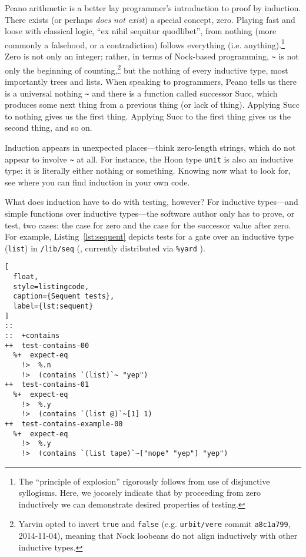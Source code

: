 \documentclass[twoside]{article}
\begin{document}
Peano arithmetic is a better lay programmer's introduction to proof by induction. There exists (or perhaps \emph{does not exist}) a special concept, zero. Playing fast and loose with classical logic, “ex nihil sequitur quodlibet”, from nothing (more commonly a falsehood, or a contradiction) follows everything (i.e. anything).\footnote{The “principle of explosion” rigorously follows from use of disjunctive syllogisms.  Here, we jocosely indicate that by proceeding from zero inductively we can demonstrate desired properties of testing.} Zero is not only an integer; rather, in terms of Nock-based programming, \lstinline[style=inlinecode]{~} is not only the beginning of counting,\footnote{Yarvin opted to invert \texttt{true} and \texttt{false} (e.g. \texttt{urbit/vere} commit \texttt{a8c1a799}, 2014-11-04), meaning that Nock loobeans do not align inductively with other inductive types.} but the nothing of every inductive type, most importantly trees and lists. When speaking to programmers, Peano tells us there is a universal nothing \lstinline[style=inlinecode]{~} and there is a function called successor $\textrm{Succ}$, which produces some next thing from a previous thing (or lack of thing). Applying $\textrm{Succ}$ to nothing gives us the first thing.  Applying $\textrm{Succ}$ to the first thing gives us the second thing, and so on.

Induction appears in unexpected places—think zero-length strings, which do not appear to involve \lstinline[style=inlinecode]{~} at all. For instance, the Hoon type \texttt{unit} is also an inductive type: it is literally either nothing or something. Knowing now what to look for, see where you can find induction in your own code.

What does induction have to do with testing, however?  For inductive types—and simple functions over inductive types—the software author only has to prove, or test, two cases:  the case for zero and the case for the successor value after zero.  For example, Listing~\ref{lst:sequent} depicts tests for a gate over an inductive type (\texttt{list}) in \texttt{/lib/seq} (\citet{FoxSequent}, currently distributed via \texttt{\%yard} \citep{UrbitYard}).

\begin{lstlisting}[
  float,
  style=listingcode,
  caption={Sequent tests},
  label={lst:sequent}
]
::
::  +contains
++  test-contains-00
  %+  expect-eq
    !>  %.n
    !>  (contains `(list)`~ "yep")
++  test-contains-01
  %+  expect-eq
    !>  %.y
    !>  (contains `(list @)`~[1] 1) 
++  test-contains-example-00
  %+  expect-eq
    !>  %.y
    !>  (contains `(list tape)`~["nope" "yep"] "yep")
\end{lstlisting}
\end{document}

